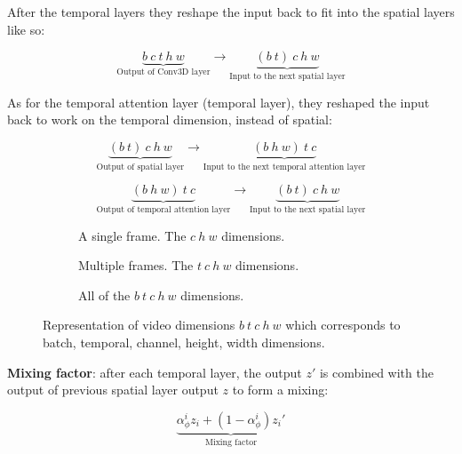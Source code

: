 After the temporal layers they reshape the input back to fit into the spatial layers like so:

\[ \underbrace{b\ c\ t\ h\ w}_{\text{Output of Conv3D layer}} \rightarrow \underbrace{(b\ t)\ c\ h\ w}_{\text{Input to the next spatial layer}} \]

As for the temporal attention layer (temporal layer), they reshaped the input back to work on the temporal dimension, instead of spatial:

\[ \underbrace{(b\ t)\ c\ h\ w}_{\text{Output of spatial layer}} \rightarrow \underbrace{(b\ h\ w) \ t\ c}_{\text{Input to the next temporal attention layer}} \]

\[ \underbrace{(b\ h\ w) \ t\ c}_{\text{Output of temporal attention layer}} \rightarrow \underbrace{(b\ t)\ c\ h\ w}_{\text{Input to the next spatial layer}} \]

\begin{figure}
    \centering

    \begin{subfigure}{0.3\textwidth}
        \centering
        \scalebox{0.5}{
            
        }
        \caption{A single frame. The $c\ h\ w$ dimensions.}
    \end{subfigure}

    \begin{subfigure}{0.3\textwidth}
        \centering
        \scalebox{0.5}{
            
        }
        \caption{Multiple frames. The $t\ c\ h\ w$ dimensions.}
    \end{subfigure}

    \begin{subfigure}{0.7\textwidth}
        \centering
        \scalebox{0.5}{
            
        }
        \caption{All of the $b\ t\ c\ h\ w$ dimensions. }
    \end{subfigure}

    \caption{Representation of video dimensions $b\ t\ c\ h\ w$ which corresponds to batch, temporal, channel, height, width dimensions.}
\end{figure}





\textbf{Mixing factor}: after each temporal layer, the output $z'$ is combined with the output of previous spatial layer output $z$ to form a mixing: 

\[ \underbrace{\alpha_\phi^i z_{i} + (1 - \alpha_\phi^i) z_{i}'}_{\text{Mixing factor}} \] 

